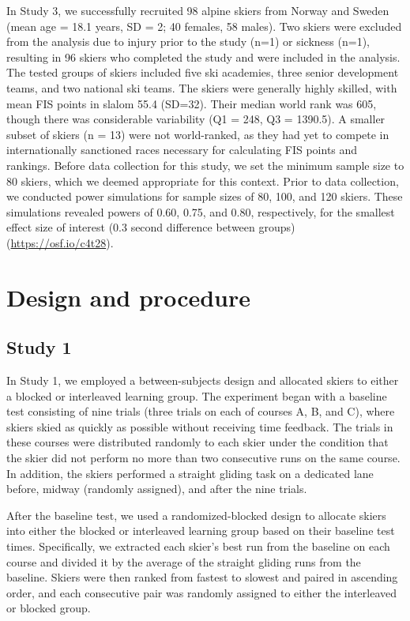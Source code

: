 In Study 3, we successfully recruited 98 alpine skiers from Norway and Sweden (mean age = 18.1 years, SD = 2; 40 females, 58 males). Two skiers were excluded from the analysis due to injury prior to the study (n=1) or sickness (n=1), resulting in 96 skiers who completed the study and were included in the analysis. The tested groups of skiers included five ski academies, three senior development teams, and two national ski teams. The skiers were generally highly skilled, with mean FIS points in slalom 55.4 (SD=32). Their median world rank was 605, though there was considerable variability (Q1 = 248, Q3 = 1390.5). A smaller subset of skiers (n = 13) were not world-ranked, as they had yet to compete in internationally sanctioned races necessary for calculating FIS points and rankings. Before data collection for this study, we set the minimum sample size to 80 skiers, which we deemed appropriate for this context. Prior to data collection, we conducted power simulations for sample sizes of 80, 100, and 120 skiers. These simulations revealed powers of 0.60, 0.75, and 0.80, respectively, for the smallest effect size of interest (0.3 second difference between groups) (\url{https://osf.io/c4t28}). 


\section{Design and procedure}

\subsection{Study 1}
In Study 1, we employed a between-subjects design and allocated skiers to either a blocked or interleaved learning group. The experiment began with a baseline test consisting of nine trials (three trials on each of courses A, B, and C), where skiers skied as quickly as possible without receiving time feedback. The trials in these courses were distributed randomly to each skier under the condition that the skier did not perform no more than two consecutive runs on the same course. In addition, the skiers performed a straight gliding task on a dedicated lane before, midway (randomly assigned), and after the nine trials.

After the baseline test, we used a randomized-blocked design to allocate skiers into either the blocked or interleaved learning group based on their baseline test times. Specifically, we extracted each skier's best run from the baseline on each course and divided it by the average of the straight gliding runs from the baseline. Skiers were then ranked from fastest to slowest and paired in ascending order, and each consecutive pair was randomly assigned to either the interleaved or blocked group.

